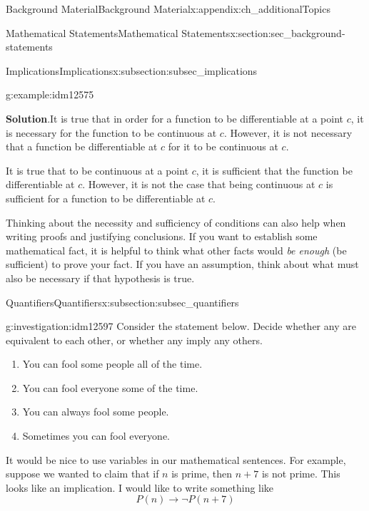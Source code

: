 \documentclass[oneside,10pt,]{book}
\numberwithin{equation}{chapter}
\def\imp{\rightarrow}
\begin{document}
\begin{appendixptx}{Background Material}{}{Background Material}{}{}{x:appendix:ch_additionalTopics}
\begin{sectionptx}{Mathematical Statements}{}{Mathematical Statements}{}{}{x:section:sec_background-statements}
\begin{subsectionptx}{Implications}{}{Implications}{}{}{x:subsection:subsec_implications}
\begin{example}{}{g:example:idm12575}
\par\smallskip%
\noindent\textbf{Solution}.\hypertarget{g:solution:idm12582}{}\quad{}It is true that in order for a function to be differentiable at a point \(c\), it is necessary for the function to be continuous at \(c\). However, it is not necessary that a function be differentiable at \(c\) for it to be continuous at \(c\).%
\par
It is true that to be continuous at a point \(c\), it is sufficient that the function be differentiable at \(c\). However, it is not the case that being continuous at \(c\) is sufficient for a function to be differentiable at \(c\).%
\end{example}
Thinking about the necessity and sufficiency of conditions can also help when writing proofs and justifying conclusions. If you want to establish some mathematical fact, it is helpful to think what other facts would \emph{be enough} (be sufficient) to prove your fact. If you have an assumption, think about what must also be necessary if that hypothesis is true.%
\end{subsectionptx}
%
%
\typeout{************************************************}
\typeout{************************************************}
%
\begin{subsectionptx}{Quantifiers}{}{Quantifiers}{}{}{x:subsection:subsec_quantifiers}
\begin{investigation}{}{g:investigation:idm12597}%
Consider the statement below. Decide whether any are equivalent to each other, or whether any imply any others.%
\par
%
\begin{enumerate}
\item{}You can fool some people all of the time.%
\item{}You can fool everyone some of the time.%
\item{}You can always fool some people.%
\item{}Sometimes you can fool everyone.%
\end{enumerate}
%
\end{investigation}
It would be nice to use variables in our mathematical sentences. For example, suppose we wanted to claim that if \(n\) is prime, then \(n+7\) is not prime. This looks like an implication. I would like to write something like%
\begin{equation*}
P(n) \imp \neg P(n+7) 
\end{equation*}

\end{subsectionptx}
\end{sectionptx}
\end{appendixptx}
\end{document}
